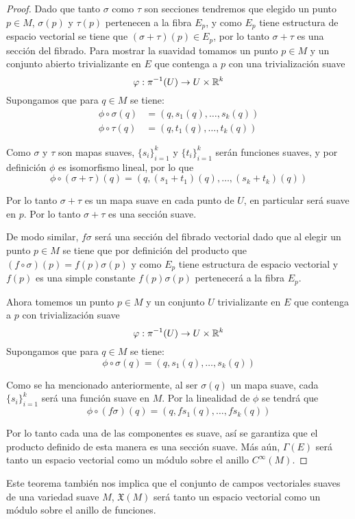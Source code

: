 \begin{proof}
  Dado que tanto $\sigma$ como $\tau$ son secciones tendremos que elegido un punto $p \in M$, $\sigma(p)$ y $\tau(p)$ pertenecen a la fibra $E_p$, y como $E_p$ tiene estructura de espacio vectorial se tiene que $(\sigma + \tau)(p) \in E_p$, por lo tanto $\sigma + \tau$ es una sección del fibrado. Para mostrar la suavidad tomamos un punto $p \in M$ y un conjunto abierto trivializante en $E$ que contenga a $p$ con una trivialización suave 
  \[
    \varphi: \pi^{-1}(U) \to U \times \mathbb{R}^k
  \]
Supongamos que para $q \in M$ se tiene:
\begin{align*}
  \phi \circ \sigma(q) &= (q, s_1(q), \dots, s_k(q))\\
  \phi \circ \tau(q) &= (q, t_1(q), \dots, t_k(q))
\end{align*}

  Como $\sigma$ y $\tau$ son mapas suaves, $\{s_i\}_{i=1}^k$ y  $\{t_i\}_{i=1}^k$ serán funciones suaves, y por definición $\phi$ es isomorfismo lineal, por lo que
\[
  \phi \circ (\sigma + \tau)(q) = (q, (s_1 + t_1)(q), \dots, (s_k + t_k)(q))
\]

  Por lo tanto $\sigma + \tau$ es un mapa suave en cada punto de $U$, en particular será suave en $p$. Por lo tanto $\sigma + \tau$ es una sección suave.

  De modo similar, $f\sigma$ será una sección del fibrado vectorial dado que al elegir un punto $p \in M$ se tiene que por definición del producto que $(f \circ \sigma)(p) = f(p)\sigma(p)$ y como $E_p$ tiene estructura de espacio vectorial y $f(p)$ es una simple constante $f(p)\sigma(p)$ pertenecerá a la fibra $E_p$. 

  Ahora tomemos un punto $p \in M$ y un conjunto $U$ trivializante en $E$ que contenga a $p$ con trivialización suave
  \[
    \varphi: \pi^{-1}(U) \to U \times \mathbb{R}^{k}
  \]
  Supongamos que para $q \in M$ se tiene:
  \[
    \phi \circ \sigma(q) = (q, s_1(q), \dots, s_k(q))
  \]

  Como se ha mencionado anteriormente, al ser $\sigma(q)$ un mapa suave, cada $\{s_i\}_{i=1}^k$ será una función suave en $M$. Por la linealidad de $\phi$ se tendrá que 
  \[
    \phi \circ (f \sigma)(q) = (q, fs_1(q),\dots, fs_k(q))
  \]
  
  Por lo tanto cada una de las componentes es suave, así se garantiza que el producto definido de esta manera es una sección suave. Más aún, $\Gamma(E)$ será tanto un espacio vectorial como un módulo sobre el anillo $C^{\infty}(M)$.
\end{proof}

Este teorema también nos implica que el conjunto de campos vectoriales suaves de una variedad suave $M$, $\mathfrak{X}(M)$ será tanto un espacio vectorial como un módulo sobre el anillo de funciones.

